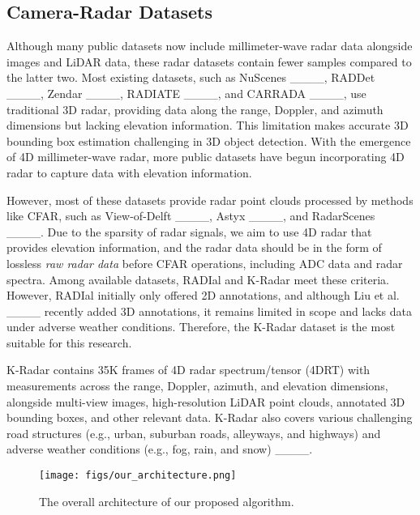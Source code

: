 \subsection{Camera-Radar Datasets}
Although many public datasets now include millimeter-wave radar data alongside images and LiDAR data, 
these radar datasets contain fewer samples compared to the latter two. 
Most existing datasets, such as NuScenes ____, RADDet ____, Zendar ____, RADIATE ____, and CARRADA ____, 
use traditional 3D radar, 
providing data along the range, Doppler, and azimuth dimensions but lacking elevation information. 
This limitation makes accurate 3D bounding box estimation challenging in 3D object detection.
With the emergence of 4D millimeter-wave radar, 
more public datasets have begun incorporating 4D radar to capture data with elevation information. 

However, most of these datasets provide radar point clouds processed by methods like CFAR, 
such as View-of-Delft ____, Astyx ____, and RadarScenes ____. 
Due to the sparsity of radar signals, we aim to use 4D radar that provides elevation information, 
and the radar data should be in the form of lossless \textit{raw radar data} before CFAR operations, 
including ADC data and radar spectra. 
Among available datasets, RADIal and K-Radar meet these criteria. 
However, RADIal initially only offered 2D annotations, 
and although Liu et al. ____ recently added 3D annotations, 
it remains limited in scope and lacks data under adverse weather conditions. 
Therefore, the K-Radar dataset is the most suitable for this research.

K-Radar contains 35K frames of 4D radar spectrum/tensor (4DRT) with measurements across 
the range, Doppler, azimuth, and elevation dimensions, 
alongside multi-view images, high-resolution LiDAR point clouds, annotated 3D bounding boxes, and other relevant data. 
K-Radar also covers various challenging road structures (e.g., urban, suburban roads, alleyways, and highways) 
and adverse weather conditions (e.g., fog, rain, and snow) ____.


\begin{figure*}[ht]
	\centerline{
		\texttt{[image: figs/our\_architecture.png]}
	}
	\caption{The overall architecture of our proposed algorithm.}
	\label{our_arch}
\end{figure*}

